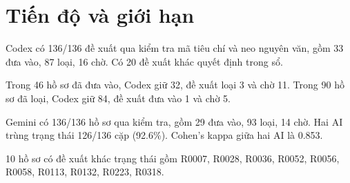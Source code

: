 \section*{Tiến độ và giới hạn}

Codex có 136/136 đề xuất qua kiểm tra mã tiêu chí và neo nguyên văn, gồm 33 đưa vào, 87 loại, 16 chờ. Có 20 đề xuất khác quyết định trong sổ.

Trong 46 hồ sơ đã đưa vào, Codex giữ 32, đề xuất loại 3 và chờ 11. Trong 90 hồ sơ đã loại, Codex giữ 84, đề xuất đưa vào 1 và chờ 5.

Gemini có 136/136 hồ sơ qua kiểm tra, gồm 29 đưa vào, 93 loại, 14 chờ. Hai AI trùng trạng thái 126/136 cặp (92.6\%). Cohen’s kappa giữa hai AI là 0.853.

10 hồ sơ có đề xuất khác trạng thái gồm R0007, R0028, R0036, R0052, R0056, R0058, R0113, R0132, R0223, R0318.

